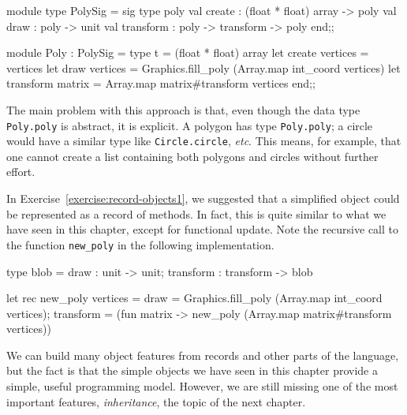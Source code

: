 \begin{ocaml}
module type PolySig = sig
   type poly
   val create : (float * float) array -> poly
   val draw : poly -> unit
   val transform : poly -> transform -> poly
end;;

module Poly : PolySig =
   type t = (float * float) array
   let create vertices = vertices
   let draw vertices = Graphics.fill_poly (Array.map int_coord vertices)
   let transform matrix = Array.map matrix#transform vertices
end;;
\end{ocaml}
%
The main problem with this approach is that, even though the data
type \hbox{\lstinline/Poly.poly/} is abstract, it is explicit.  A polygon has
type \hbox{\lstinline/Poly.poly/}; a circle would have a similar type
like \hbox{\lstinline/Circle.circle/}, \emph{etc}.  This means, for example, that one cannot create a list
containing both polygons and circles without further effort.

In Exercise~\ref{exercise:record-objects1}, we suggested that a simplified object could be
represented as a record of methods.  In fact, this is quite similar to what we have seen in this
chapter, except for functional update.  Note the recursive call to the function \hbox{\lstinline/new_poly/}
in the following implementation.

\begin{ocaml}
type blob =
   { draw : unit -> unit;
     transform : transform -> blob
   }

let rec new_poly vertices =
   { draw = Graphics.fill_poly (Array.map int_coord vertices);
     transform = (fun matrix -> new_poly (Array.map matrix#transform vertices))
   }
\end{ocaml}
%
We can build many object features from records and other parts of the language, but the fact
is that the simple objects we have seen in this chapter provide a simple, useful programming model.
However, we are still missing one of the most important features, \emph{inheritance}, the topic of
the next chapter.

